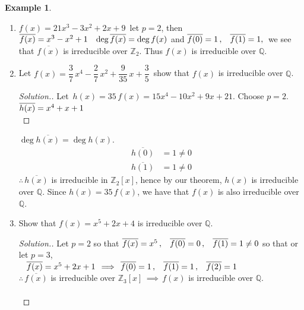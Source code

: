 \documentclass[11pt,a4paper]{article}
\theoremstyle{definition}
\newtheorem{exa}[thm]{Example}
\newenvironment{solution}
  {\renewcommand{\qedsymbol}{}\begin{proof}[\textit{Solution}.]}
  {\end{proof}}
\begin{document}
\begin{exa}
\begin{enumerate}
\item $f(x) = 21x^3 - 3x^2 + 2x + 9\, $ let $p = 2$, then $\overline{f(x)}  = x^3 - x^2 + 1\hspace{0.3cm} \deg \overline{f(x)} = \deg f(x)$ and $\overline{f(0)} = 1\, , \hspace{0.3cm} \overline{f(1)} = 1,\,$ we see that $\overline{f(x)}$ is irreducible over $\mathbb{Z}_2$. Thus $f(x)$ is irreducible over $\mathbb{Q}$.\\


\item Let $f(x) = \dfrac{3}{7}\, x^4 - \dfrac{2}{7}\, x^2 + \dfrac{9}{35}\, x + \dfrac{3}{5}\,$ show that $f(x)$ is irreducible over $\mathbb{Q}$.\\

\begin{solution}
Let $\, h(x) = 35\, f(x) = 15x^4 - 10 x^2 + 9x + 21$. Choose $p = 2$. $\overline{h(x)} = x^4 + x + 1\hspace{0.3cm}$\\
\end{solution}

$ \deg \overline{h(x)} = \deg h(x)$.
\begin{align*}
\overline{h(0)} & = 1 \neq 0\\
\overline{h(1)} & = 1 \neq 0
\end{align*}
$\therefore\,\overline{h(x)}$ is irreducible in $\mathbb{Z}_2[x]$, hence by our theorem, $h(x)$ is irreducible over $\mathbb{Q}$. Since $h(x) = 35\, f(x)$, we have that $f(x)$ is also irreducible over $\mathbb{Q}$.\\

\item Show that $f(x)  = x^5 + 2x + 4$ is irreducible over $\mathbb{Q}$.\\




\pagebreak
\begin{solution}
Let $p = 2$ so that $\overline{f(x)} = x^5\, ,\hspace{0.3cm} \overline{f(0)} = 0\, , \hspace{0.3cm} \overline{f(1)} = 1 \neq 0$ so that or let $p = 3$,\\$\hspace{0.3cm} \overline{f(x)} = x^5 + 2x + 1\, \implies\, \overline{f(0)} = 1\, , \hspace{0.3cm} \overline{f(1)} = 1\, , \hspace{0.3cm} \overline{f(2)} = 1$\\
$\therefore\,\overline{f(x)}$ is irreducible over $\mathbb{Z}_3[x]\, \implies\, f(x) $ is irreducible over $\mathbb{Q}$.\\\\
\end{solution}
\end{enumerate}
\end{exa}
\end{document}
